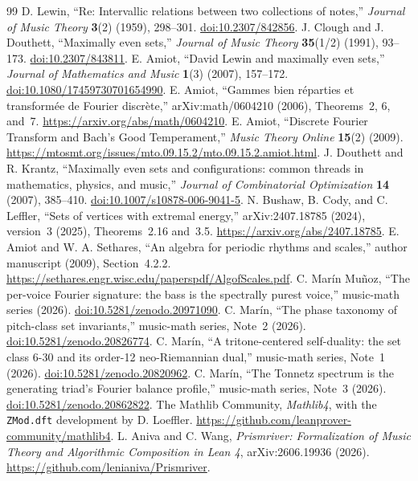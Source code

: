 \documentclass[11pt]{article}
\newcommand{\lean}[1]{\texttt{#1}}
\begin{document}
\FloatBarrier
\begin{thebibliography}{99}\small
\setlength{\itemsep}{3pt}
 D. Lewin, ``Re: Intervallic relations between two collections of notes,''
\emph{Journal of Music Theory} \textbf{3}(2) (1959), 298--301.
\href{https://doi.org/10.2307/842856}{doi:10.2307/842856}.
 J. Clough and J. Douthett, ``Maximally even sets,''
\emph{Journal of Music Theory} \textbf{35}(1/2) (1991), 93--173.
\href{https://doi.org/10.2307/843811}{doi:10.2307/843811}.
 E. Amiot, ``David Lewin and maximally even sets,''
\emph{Journal of Mathematics and Music} \textbf{1}(3) (2007), 157--172.
\href{https://doi.org/10.1080/17459730701654990}{doi:10.1080/17459730701654990}.
 E. Amiot, ``Gammes bien r\'eparties et transform\'ee de Fourier discr\`ete,''
arXiv:math/0604210 (2006), Theorems~2, 6, and~7.
\url{https://arxiv.org/abs/math/0604210}.
 E. Amiot, ``Discrete Fourier Transform and Bach's Good Temperament,''
\emph{Music Theory Online} \textbf{15}(2) (2009).
\url{https://mtosmt.org/issues/mto.09.15.2/mto.09.15.2.amiot.html}.
 J. Douthett and R. Krantz, ``Maximally even sets and configurations: common
threads in mathematics, physics, and music,'' \emph{Journal of Combinatorial Optimization}
\textbf{14} (2007), 385--410.
\href{https://doi.org/10.1007/s10878-006-9041-5}{doi:10.1007/s10878-006-9041-5}.
 N. Bushaw, B. Cody, and C. Leffler, ``Sets of vertices with extremal energy,''
arXiv:2407.18785 (2024), version~3 (2025), Theorems~2.16 and~3.5.
\url{https://arxiv.org/abs/2407.18785}.
 E. Amiot and W. A. Sethares, ``An algebra for periodic rhythms and scales,''
author manuscript (2009), Section~4.2.2.
\url{https://sethares.engr.wisc.edu/paperspdf/AlgofScales.pdf}.
 C. Mar\'in Mu\~noz, ``The per-voice Fourier signature: the bass is the
spectrally purest voice,'' music-math series (2026).
\href{https://doi.org/10.5281/zenodo.20971090}{doi:10.5281/zenodo.20971090}.
 C. Mar\'in, ``The phase taxonomy of pitch-class set invariants,''
music-math series, Note~2 (2026).
\href{https://doi.org/10.5281/zenodo.20826774}{doi:10.5281/zenodo.20826774}.
 C. Mar\'in, ``A tritone-centered self-duality: the set class 6-30 and its
order-12 neo-Riemannian dual,'' music-math series, Note~1 (2026).
\href{https://doi.org/10.5281/zenodo.20820962}{doi:10.5281/zenodo.20820962}.
 C. Mar\'in, ``The Tonnetz spectrum is the generating triad's Fourier balance
profile,'' music-math series, Note~3 (2026).
\href{https://doi.org/10.5281/zenodo.20862822}{doi:10.5281/zenodo.20862822}.
 The Mathlib Community, \emph{Mathlib4}, with the \lean{ZMod.dft}
development by D. Loeffler. \url{https://github.com/leanprover-community/mathlib4}.
 L. Aniva and C. Wang, \emph{Prismriver: Formalization of Music Theory
and Algorithmic Composition in Lean 4}, arXiv:2606.19936 (2026).
\url{https://github.com/lenianiva/Prismriver}.
\end{thebibliography}
\end{document}
